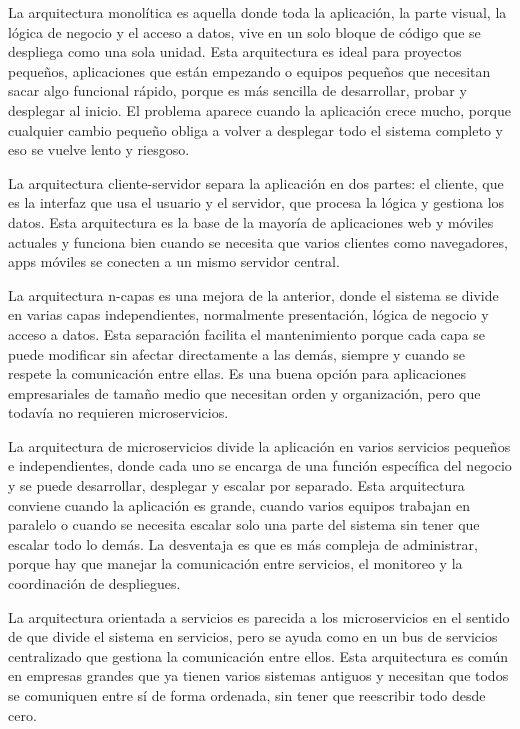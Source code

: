 \documentclass[12pt,letterpaper]{article}
\begin{document}
La arquitectura monolítica es aquella donde toda la aplicación, la parte visual, la lógica de negocio y el acceso a datos, vive en un solo bloque de código que se despliega como una sola unidad. Esta arquitectura es ideal para proyectos pequeños, aplicaciones que están empezando o equipos pequeños que necesitan sacar algo funcional rápido, porque es más sencilla de desarrollar, probar y desplegar al inicio. El problema aparece cuando la aplicación crece mucho, porque cualquier cambio pequeño obliga a volver a desplegar todo el sistema completo y eso se vuelve lento y riesgoso.

La arquitectura cliente-servidor separa la aplicación en dos partes: el cliente, que es la interfaz que usa el usuario y el servidor, que procesa la lógica y gestiona los datos. Esta arquitectura es la base de la mayoría de aplicaciones web y móviles actuales y funciona bien cuando se necesita que varios clientes como navegadores, apps móviles se conecten a un mismo servidor central.

La arquitectura n-capas es una mejora de la anterior, donde el sistema se divide en varias capas independientes, normalmente presentación, lógica de negocio y acceso a datos. Esta separación facilita el mantenimiento porque cada capa se puede modificar sin afectar directamente a las demás, siempre y cuando se respete la comunicación entre ellas. Es una buena opción para aplicaciones empresariales de tamaño medio que necesitan orden y organización, pero que todavía no requieren  microservicios.

La arquitectura de microservicios divide la aplicación en varios servicios pequeños e independientes, donde cada uno se encarga de una función específica del negocio y se puede desarrollar, desplegar y escalar por separado. Esta arquitectura conviene cuando la aplicación es grande, cuando varios equipos trabajan en paralelo o cuando se necesita escalar solo una parte del sistema sin tener que escalar todo lo demás. La desventaja es que es más compleja de administrar, porque hay que manejar la comunicación entre servicios, el monitoreo y la coordinación de despliegues.

La arquitectura orientada a servicios es parecida a los microservicios en el sentido de que divide el sistema en servicios, pero se ayuda como en un bus de servicios centralizado que gestiona la comunicación entre ellos. Esta arquitectura es común en empresas grandes que ya tienen varios sistemas antiguos y necesitan que todos se comuniquen entre sí de forma ordenada, sin tener que reescribir todo desde cero.
\end{document}
